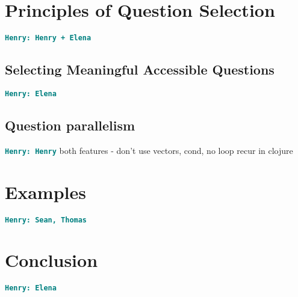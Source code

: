 \documentclass[12pt]{article}
\newcommand{\comment}[1]{{\bf \tt  {#1}}}
\newcommand{\hfcomment}[1]{\textcolor{Teal}{\comment{Henry: {#1}}}}
\begin{document}
\section{Principles of Question Selection}\label{sec:select}
	\hfcomment{Henry + Elena}
	\subsection{Selecting Meaningful Accessible Questions}\label{sec:meaning}
	\hfcomment{Elena}
	\subsection{Question parallelism}\label{sec:parallel}
	\hfcomment{Henry}
	both features - don't use vectors, cond, no loop recur in clojure
\section{Examples}\label{sec:examples}
	\hfcomment{Sean, Thomas}

\section{Conclusion}\label{sec:conclusion}
	\hfcomment{Elena}




\end{document}
